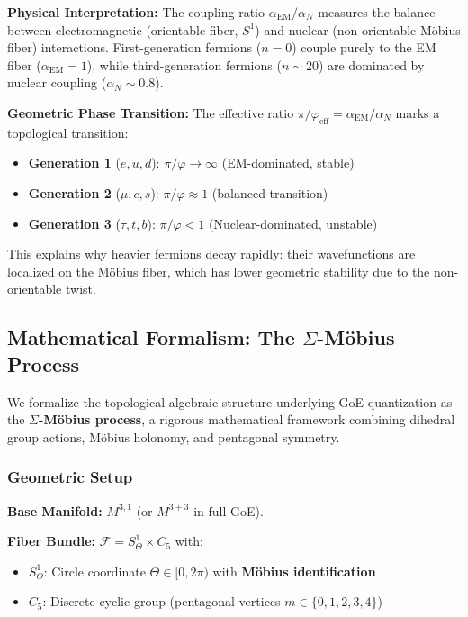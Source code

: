 \documentclass[12pt]{article}
\theoremstyle{definition}
\theoremstyle{plain}
\begin{document}
\textbf{Physical Interpretation:} The coupling ratio $\alpha_{\text{EM}}/\alpha_N$ measures the balance between electromagnetic (orientable fiber, $S^1$) and nuclear (non-orientable M\"obius fiber) interactions. First-generation fermions ($n=0$) couple purely to the EM fiber ($\alpha_{\text{EM}} = 1$), while third-generation fermions ($n \sim 20$) are dominated by nuclear coupling ($\alpha_N \sim 0.8$).

\textbf{Geometric Phase Transition:} The effective ratio $\pi/\varphi_{\text{eff}} = \alpha_{\text{EM}}/\alpha_N$ marks a topological transition:

\begin{itemize}
\item \textbf{Generation 1} ($e, u, d$): $\pi/\varphi \to \infty$ (EM-dominated, stable)
\item \textbf{Generation 2} ($\mu, c, s$): $\pi/\varphi \approx 1$ (balanced transition)
\item \textbf{Generation 3} ($\tau, t, b$): $\pi/\varphi < 1$ (Nuclear-dominated, unstable)
\end{itemize}

This explains why heavier fermions decay rapidly: their wavefunctions are localized on the M\"obius fiber, which has lower geometric stability due to the non-orientable twist.

\subsection{Mathematical Formalism: The $\Sigma$-M\"obius Process}
\label{sec:sigma_moebius}

We formalize the topological-algebraic structure underlying GoE quantization as the \textbf{$\Sigma$-M\"obius process}, a rigorous mathematical framework combining dihedral group actions, M\"obius holonomy, and pentagonal symmetry.

\subsubsection{Geometric Setup}

\textbf{Base Manifold:} $M^{3,1}$ (or $M^{3+3}$ in full GoE).

\textbf{Fiber Bundle:} $\mathcal{F} = S^1_\Theta \times C_5$ with:
\begin{itemize}
\item $S^1_\Theta$: Circle coordinate $\Theta \in [0, 2\pi)$ with \textbf{M\"obius identification}
\item $C_5$: Discrete cyclic group (pentagonal vertices $m \in \{0,1,2,3,4\}$)
\end{itemize}
\end{document}
